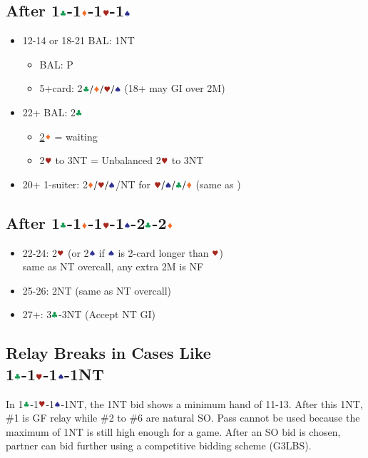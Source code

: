 \documentclass{article}
\begin{document}
\begin{multicols}{2}
\subsection{After 1$\ccc$-1$\ddd$-1$\hhh$-1$\sss$}
\label{sec:1c1d1h1s}
\begin{itemize}
    \item 12-14 or 18-21 BAL: 1NT
    \begin{itemize}
        \item BAL: P
        \item 5+card: 2$\ccc/\ddd/\hhh/\sss$ (18+ may GI over 2M)
    \end{itemize}
    \item 22+ BAL: 2$\ccc$
    \begin{itemize}
        \item \hyperref[sec:1c1d1h1s2c2d]{2$\ddd$} = waiting
        \item 2$\hhh$ to 3NT = Unbalanced 2$\hhh$ to 3NT
    \end{itemize}
    \item 20+ 1-suiter: 2$\ddd/\hhh/\sss$/NT for $\hhh/\sss/\ccc/\ddd$ (same as )
\end{itemize}

\subsection{After 1$\ccc$-1$\ddd$-1$\hhh$-1$\sss$-2$\ccc$-2$\ddd$}
\label{sec:1c1d1h1s2c2d}
\begin{itemize}
    \item 22-24: 2$\hhh$ (or 2$\sss$ if $\sss$ is 2-card longer than $\hhh$) \\
        same as NT overcall, any extra 2M is NF
    \item 25-26: 2NT (same as NT overcall)
    \item 27+: 3$\ccc$-3NT (Accept NT GI)
\end{itemize}

\subsection{Relay Breaks in Cases Like \\
1$\ccc$-1$\hhh$-1$\sss$-1NT}
In 1$\ccc$-1$\hhh$-1$\sss$-1NT, the 1NT bid shows a minimum hand of 11-13. After this 1NT, \#1 is GF relay while \#2 to \#6 are natural SO. Pass cannot be used because the maximum of 1NT is still high enough for a game. After an SO bid is chosen, partner can bid further using a competitive bidding scheme (G3LBS).


\end{multicols}
\end{document}
